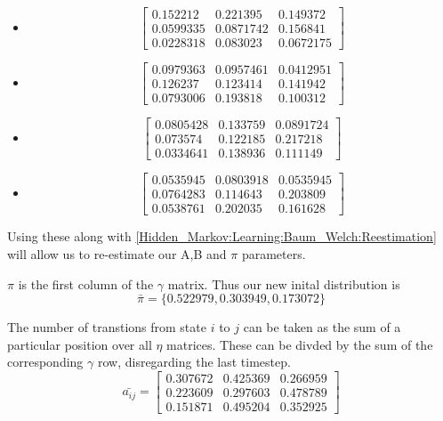 \begin{example}
        \begin{itemize}
            \item \[
                \begin{bmatrix}
                    0.152212  & 0.221395  & 0.149372  \\
                    0.0599335 & 0.0871742 &  0.156841 \\ 
                    0.0228318 & 0.083023  & 0.0672175 
                \end{bmatrix}
            \]
            \item \[
                \begin{bmatrix}
                    0.0979363 & 0.0957461 &  0.0412951 \\
                    0.126237  & 0.123414  & 0.141942 \\
                    0.0793006 & 0.193818  & 0.100312 
                \end{bmatrix}
            \]           
            \item \[
                \begin{bmatrix}
                    0.0805428 &  0.133759 &  0.0891724 \\
                    0.073574  & 0.122185  & 0.217218 \\
                    0.0334641 &  0.138936 &  0.111149                      
                \end{bmatrix}
            \]
            \item \[
                \begin{bmatrix}
                    0.0535945 & 0.0803918 &  0.0535945 \\
                    0.0764283 & 0.114643  & 0.203809 \\
                    0.0538761 & 0.202035  & 0.161628 
                \end{bmatrix}
            \]
        \end{itemize}

        Using these along with \ref{Hidden_Markov:Learning:Baum_Welch:Reestimation} will allow us to re-estimate our A,B and $\pi$ parameters.

        $\pi$ is the first column of the $\gamma$ matrix. Thus our new inital distribution is 
        \begin{equation}
            \bar{\pi} = \{0.522979,	0.303949,	0.173072\}
        \end{equation}
        
        The number of transtions from state $i$ to $j$ can be taken as the sum of a particular position over all $\eta$ matrices. These can be divded by the sum of the corresponding $\gamma$ row, disregarding the last timestep.
        \begin{equation}
            \bar{a_{ij}} = \begin{bmatrix}
                0.307672  &	0.425369  &	0.266959 \\
                0.223609  &	0.297603  &	0.478789 \\
                0.151871  &	0.495204  &	0.352925
            \end{bmatrix}
        \end{equation}


\end{example}
